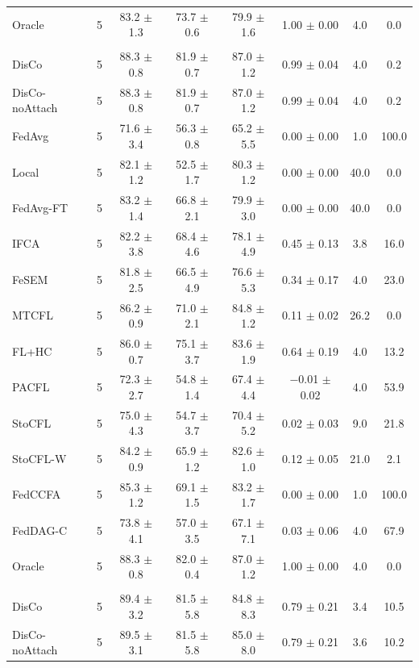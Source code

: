 {\begin{tabular}{l r c c c c c c}
Oracle & 5 & 83.2 $\pm$ 1.3 & 73.7 $\pm$ 0.6 & 79.9 $\pm$ 1.6 & 1.00 $\pm$ 0.00 & 4.0 & 0.0 \\
\addlinespace
\multicolumn{8}{l}{\textit{CIFAR-10 (ResNet) label swap}} \\
DisCo & 5 & 88.3 $\pm$ 0.8 & 81.9 $\pm$ 0.7 & 87.0 $\pm$ 1.2 & 0.99 $\pm$ 0.04 & 4.0 & 0.2 \\
DisCo-noAttach & 5 & 88.3 $\pm$ 0.8 & 81.9 $\pm$ 0.7 & 87.0 $\pm$ 1.2 & 0.99 $\pm$ 0.04 & 4.0 & 0.2 \\
FedAvg & 5 & 71.6 $\pm$ 3.4 & 56.3 $\pm$ 0.8 & 65.2 $\pm$ 5.5 & 0.00 $\pm$ 0.00 & 1.0 & 100.0 \\
Local & 5 & 82.1 $\pm$ 1.2 & 52.5 $\pm$ 1.7 & 80.3 $\pm$ 1.2 & 0.00 $\pm$ 0.00 & 40.0 & 0.0 \\
FedAvg-FT & 5 & 83.2 $\pm$ 1.4 & 66.8 $\pm$ 2.1 & 79.9 $\pm$ 3.0 & 0.00 $\pm$ 0.00 & 40.0 & 0.0 \\
IFCA & 5 & 82.2 $\pm$ 3.8 & 68.4 $\pm$ 4.6 & 78.1 $\pm$ 4.9 & 0.45 $\pm$ 0.13 & 3.8 & 16.0 \\
FeSEM & 5 & 81.8 $\pm$ 2.5 & 66.5 $\pm$ 4.9 & 76.6 $\pm$ 5.3 & 0.34 $\pm$ 0.17 & 4.0 & 23.0 \\
MTCFL & 5 & 86.2 $\pm$ 0.9 & 71.0 $\pm$ 2.1 & 84.8 $\pm$ 1.2 & 0.11 $\pm$ 0.02 & 26.2 & 0.0 \\
FL+HC & 5 & 86.0 $\pm$ 0.7 & 75.1 $\pm$ 3.7 & 83.6 $\pm$ 1.9 & 0.64 $\pm$ 0.19 & 4.0 & 13.2 \\
PACFL & 5 & 72.3 $\pm$ 2.7 & 54.8 $\pm$ 1.4 & 67.4 $\pm$ 4.4 & $-$0.01 $\pm$ 0.02 & 4.0 & 53.9 \\
StoCFL & 5 & 75.0 $\pm$ 4.3 & 54.7 $\pm$ 3.7 & 70.4 $\pm$ 5.2 & 0.02 $\pm$ 0.03 & 9.0 & 21.8 \\
StoCFL-W & 5 & 84.2 $\pm$ 0.9 & 65.9 $\pm$ 1.2 & 82.6 $\pm$ 1.0 & 0.12 $\pm$ 0.05 & 21.0 & 2.1 \\
FedCCFA & 5 & 85.3 $\pm$ 1.2 & 69.1 $\pm$ 1.5 & 83.2 $\pm$ 1.7 & 0.00 $\pm$ 0.00 & 1.0 & 100.0 \\
FedDAG-C & 5 & 73.8 $\pm$ 4.1 & 57.0 $\pm$ 3.5 & 67.1 $\pm$ 7.1 & 0.03 $\pm$ 0.06 & 4.0 & 67.9 \\
Oracle & 5 & 88.3 $\pm$ 0.8 & 82.0 $\pm$ 0.4 & 87.0 $\pm$ 1.2 & 1.00 $\pm$ 0.00 & 4.0 & 0.0 \\
\addlinespace
\multicolumn{8}{l}{\textit{AG News label swap}} \\
DisCo & 5 & 89.4 $\pm$ 3.2 & 81.5 $\pm$ 5.8 & 84.8 $\pm$ 8.3 & 0.79 $\pm$ 0.21 & 3.4 & 10.5 \\
DisCo-noAttach & 5 & 89.5 $\pm$ 3.1 & 81.5 $\pm$ 5.8 & 85.0 $\pm$ 8.0 & 0.79 $\pm$ 0.21 & 3.6 & 10.2 \\

\end{tabular}}
